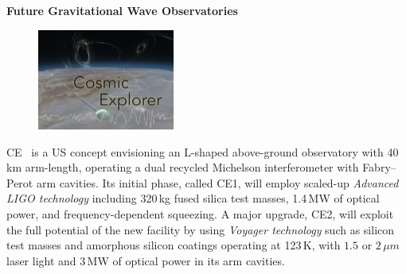 \begin{DetBox}{\bf Future Gravitational Wave Observatories}
\begin{tcolorbox}[standard jigsaw,colframe=antiquefuchsia!80!black,colback=antiquefuchsia!20!white,opacityback=0.6,coltext=black,size=small, title=Cosmic Explorer (CE)] 
\begin{figure}
\vspace{-10pt}
\includegraphics*[width=0.4\textwidth]{Figures/CE_Thumb.jpg}
\label{fig:CE_Thumb}
\vspace{-20pt}
\end{figure}
CE~\cite{CosmicExplorer2017} is a US concept envisioning an L-shaped above-ground observatory with 40\,km arm-length, operating a dual recycled Michelson interferometer with Fabry--Perot arm cavities. 
Its initial phase, called CE1, will employ scaled-up \emph{Advanced LIGO technology} including 320\,kg fused silica test masses, 1.4\,MW of optical power, and frequency-dependent squeezing. 
A major upgrade, CE2, will exploit the full potential of the new facility by using \emph{Voyager technology} such as silicon test masses and amorphous silicon coatings operating at 123\,K, with $1.5$ or $2\,\mu m$ laser light and 3\,MW of optical power in its arm cavities.

\end{tcolorbox}

\begin{tcolorbox}[standard jigsaw,colframe=azure!70!black,colback=azure!20!white,opacityback=0.6,coltext=black, size=small, title=Voyager]


\end{tcolorbox}
\end{DetBox}
